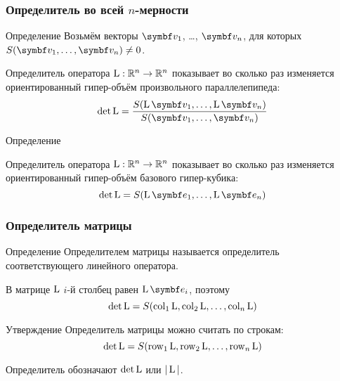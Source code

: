 \begin{frame}
    \frametitle{Определитель во всей $n$-мерности}

    \begin{block}{Определение}
        Возьмём векторы $\bv_1$, \ldots, $\bv_n$, для которых $S(\bv_1, \ldots, \bv_n)\neq 0$.

        \alert{Определитель} оператора $\operatorname{L}:\mathbb{R}^n \to \mathbb{R}^n$ показывает во сколько раз изменяется
        ориентированный гипер-объём произвольного параллелепипеда:
        \[
            \det \LL = \frac{S(\LL\bv_1, \ldots, \LL\bv_n)}{S(\bv_1, \ldots, \bv_n)}    
        \]
    \end{block}  
    
    \pause

\begin{block}{Определение}

    \alert{Определитель} оператора $\operatorname{L}:\mathbb{R}^n \to \mathbb{R}^n$ показывает во сколько раз изменяется
    ориентированный гипер-объём базового гипер-кубика:
    \[
        \det \LL = S(\LL\be_1, \ldots, \LL\be_n)
    \]
\end{block}  


\end{frame}



\begin{frame}
    \frametitle{Определитель матрицы}

    \begin{block}{Определение}
        \alert{Определителем матрицы} называется определитель соответствующего линейного оператора. 
    \end{block}
    
    \pause

    В матрице $\operatorname{L}$ $i$-й столбец равен $\LL\be_i$, поэтому 
    \[
    \det \operatorname{L} = S(\operatorname{col}_1 \operatorname{L}, \operatorname{col}_2 \operatorname{L}, \ldots, \operatorname{col}_n \operatorname{L})    
    \]

    \pause
    \begin{block}{Утверждение}
        Определитель матрицы можно считать по строкам: 
    \[
    \det \operatorname{L} = S(\operatorname{row}_1 \operatorname{L}, \operatorname{row}_2 \operatorname{L}, \ldots, \operatorname{row}_n \operatorname{L})    
    \]    
    \end{block}

    Определитель обозначают $\det \operatorname{L}$ или $|\operatorname{L}|$.

\end{frame}





